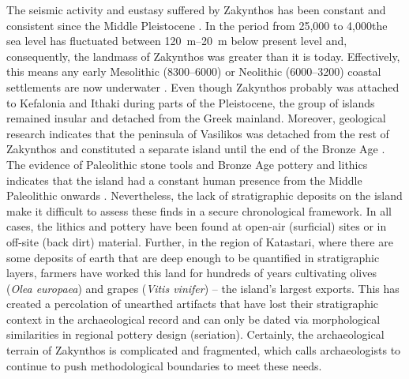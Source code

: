 The seismic activity and eustasy suffered by Zakynthos has been constant and consistent since the Middle Pleistocene \parencite[400]{Zelilidis_1998}. In the period from 25,000 to 4,000\BC the sea level has fluctuated between \SIrange[range-phrase=--]{120}{20}{\metre} below present level and, consequently, the landmass of Zakynthos was greater than it is today. Effectively, this means any early Mesolithic (8300--6000\BC) or Neolithic (6000--3200\BC) coastal settlements are now underwater \parencite[2172]{Ferentinos_2012}. Even though Zakynthos probably was attached to Kefalonia and Ithaki during parts of the Pleistocene, the group of islands remained insular and detached from the Greek mainland. Moreover, geological research indicates that the peninsula of Vasilikos was detached from the rest of Zakynthos and constituted a separate island until the end of the Bronze Age \parencite{Lambeck_2005}. The evidence of Paleolithic stone tools and Bronze Age pottery and lithics indicates that the island had a constant human presence from the Middle Paleolithic onwards \parencite[286]{Kourtessi-Philippakis_1999}. Nevertheless, the lack of stratigraphic deposits on the island make it difficult to assess these finds in a secure chronological framework. In all cases, the lithics and pottery have been found at open-air (surficial) sites or in off-site (back dirt) material. Further, in the region of Katastari, where there are some deposits of earth that are deep enough to be quantified in stratigraphic layers, farmers have worked this land for hundreds of years cultivating olives (\textit{Olea europaea}) and grapes (\textit{Vitis vinifer}) – the island’s largest exports. This has created a percolation of unearthed artifacts that have lost their stratigraphic context in the archaeological record and can only be dated via morphological similarities in regional pottery design (seriation). Certainly, the archaeological terrain of Zakynthos is complicated and fragmented, which calls archaeologists to continue to push methodological boundaries to meet these needs.
	
